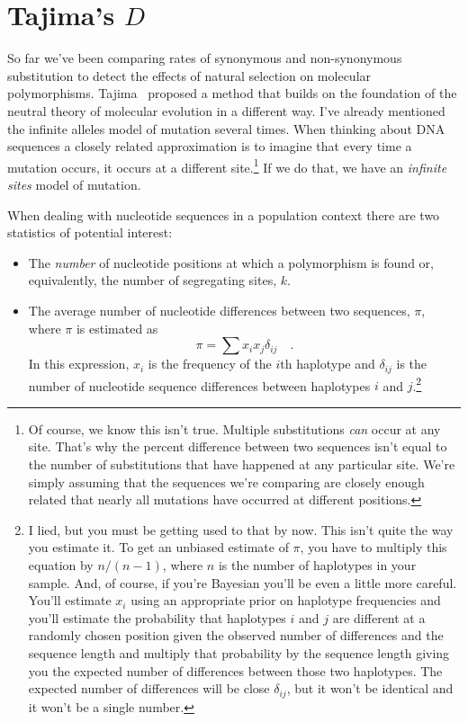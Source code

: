 \documentclass[12pt]{article}
\begin{document}
\section*{Tajima's $D$}

So far we've been comparing rates of synonymous and non-synonymous
substitution to detect the effects of natural selection on molecular
polymorphisms. Tajima~\cite{Tajima89} proposed a method that builds on
the foundation of the neutral theory of molecular evolution in a
different way. I've already mentioned the infinite alleles model of
mutation several times. When thinking about DNA sequences a closely
related approximation is to imagine that every time a mutation occurs,
it occurs at a different site.\footnote{Of course, we know this isn't
  true. Multiple substitutions {\it can\/} occur at any site. That's
  why the percent difference between two sequences isn't equal to the
  number of substitutions that have happened at any particular
  site. We're simply assuming that the sequences we're comparing are
  closely enough related that nearly all mutations have occurred at
  different positions.} If we do that, we have an {\it infinite
  sites\/} model of mutation.

When dealing with nucleotide sequences in a population context there
are two statistics of potential interest:

\begin{itemize}

\item The {\it number\/} of nucleotide positions at which a
  polymorphism is found or, equivalently, the number of segregating
  sites, $k$.

\item The average number of nucleotide differences between two
  sequences, $\pi$, where $\pi$ is estimated as
\[
\pi = \sum x_ix_j\delta_{ij} \quad .
\]
In this expression, $x_i$ is the frequency of the $i$th haplotype and
$\delta_{ij}$ is the number of nucleotide sequence differences between
haplotypes $i$ and $j$.\footnote{I lied, but you must be getting used
  to that by now. This isn't quite the way you estimate it. To get an
  unbiased estimate of $\pi$, you have to multiply this equation by
  $n/(n-1)$, where $n$ is the number of haplotypes in your
  sample. And, of course, if you're Bayesian you'll be even a little
  more careful. You'll estimate $x_i$ using an appropriate prior on
  haplotype frequencies and you'll estimate the probability that
  haplotypes $i$ and $j$ are different at a randomly chosen position
  given the observed number of differences and the sequence length and
  multiply that probability by the sequence length giving you the
  expected number of differences between those two haplotypes. The
  expected number of differences will be close $\delta_{ij}$, but it
  won't be identical and it won't be a single number.}

\end{itemize}
\end{document}
